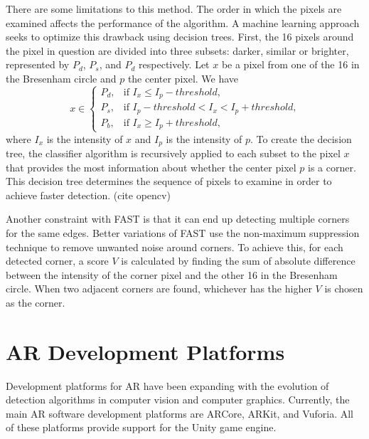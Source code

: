There are some limitations to this method. The order in which the pixels are examined affects the performance of the algorithm. A machine learning approach seeks to optimize this drawback using decision trees. First, the 16 pixels around the pixel in question are divided into three subsets: darker, similar or brighter, represented by $P_d$, $P_s$, and $P_d$ respectively. Let $x$ be a pixel from one of the 16 in the Bresenham circle and $p$ the center pixel. We have
\begin{equation}
x \in \begin{cases}
	P_d, & \text{if $I_x \leq I_p - threshold$,} \\
	P_s, & \text{if $I_p - threshold < I_x < I_p + threshold$,} \\
	P_b, & \text{if $I_x \geq I_p + threshold$,}
	\end{cases}
\end{equation}
where $I_x$ is the intensity of $x$ and $I_p$ is the intensity of $p$. To create the decision tree, the classifier algorithm is recursively applied to each subset to the pixel $x$ that provides the most information about whether the center pixel $p$ is a corner. This decision tree determines the sequence of pixels to examine in order to achieve faster detection. (cite opencv)

Another constraint with FAST is that it can end up detecting multiple corners for the same edges. Better variations of FAST use the non-maximum suppression technique to remove unwanted noise around corners. To achieve this, for each detected corner, a score $V$ is calculated by finding the sum of absolute difference between the intensity of the corner pixel and the other 16 in the Bresenham circle. When two adjacent corners are found, whichever has the higher $V$ is chosen as the corner.

\section{AR Development Platforms}
Development platforms for AR have been expanding with the evolution of detection algorithms in computer vision and computer graphics. Currently, the main AR software development platforms are ARCore, ARKit, and Vuforia. All of these platforms provide support for the Unity game engine.

